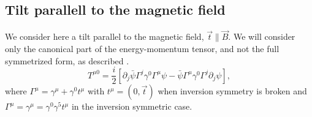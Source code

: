 \subsection{Tilt parallell to the magnetic field}
We consider here a tilt parallel to the magnetic field, \( \vec{t} \parallel \vec{B} \). We will consider only the canonical part of the energy-momentum tensor, and not the full symmetrized form, as described \citeauthor{vanderwurffMagnetovorticalThermoelectricTransport2019} \cite{vanderwurffMagnetovorticalThermoelectricTransport2019}.
\begin{equation}
  \label{eq:94}
  T^{\mu 0} = \frac{i}{2}
  [
  \partial_j \bar{\psi} \Gamma ^j \gamma ^0 \Gamma ^{\mu } \psi - \bar{\psi} \Gamma ^{\mu } \gamma ^0 \Gamma ^j \partial _j \psi
  ],
\end{equation}
where \( \Gamma ^{\mu } = \gamma ^{\mu } + \gamma ^0 t^{\mu } \) with \( t^{\mu } = (0, \vec{t}) \) when inversion symmetry is broken and \( \Gamma ^{\mu }= \gamma ^{\mu } = \gamma ^0 \gamma ^5 t^{\mu } \) in the inversion symmetric case.


